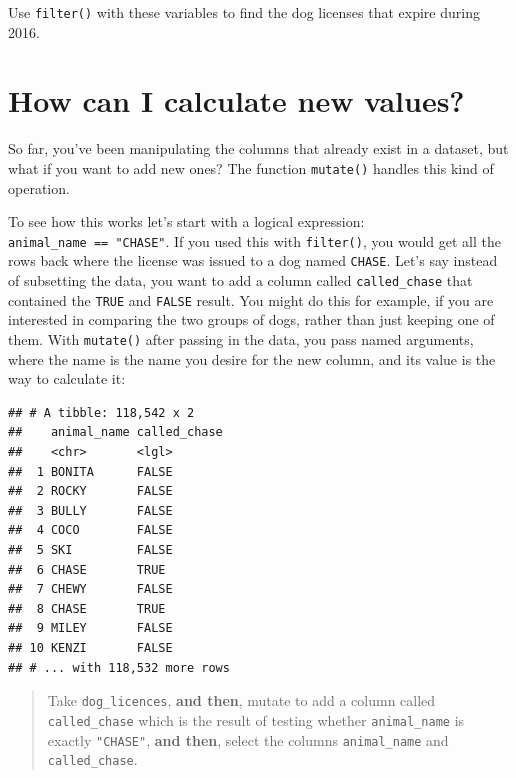 \documentclass[]{Nemilov}
\newenvironment{Shaded}{\begin{snugshade}}{\end{snugshade}}
\newcommand{\DataTypeTok}[1]{\textcolor[rgb]{0.13,0.29,0.53}{#1}}
\newcommand{\KeywordTok}[1]{\textcolor[rgb]{0.13,0.29,0.53}{\textbf{#1}}}
\newcommand{\NormalTok}[1]{#1}
\newcommand{\OperatorTok}[1]{\textcolor[rgb]{0.81,0.36,0.00}{\textbf{#1}}}
\newcommand{\StringTok}[1]{\textcolor[rgb]{0.31,0.60,0.02}{#1}}
\begin{document}
Use \texttt{filter()} with these variables to find the dog licenses that expire during 2016.

\hypertarget{how-can-i-calculate-new-values}{%
\section{How can I calculate new values?}\label{how-can-i-calculate-new-values}}

So far, you've been manipulating the columns that already exist in a dataset, but what if you want to add new ones? The function \texttt{mutate()} handles this kind of operation.

To see how this works let's start with a logical expression: \texttt{animal\_name\ ==\ "CHASE"}. If you used this with \texttt{filter()}, you would get all the rows back where the license was issued to a dog named \texttt{CHASE}. Let's say instead of subsetting the data, you want to add a column called \texttt{called\_chase} that contained the \texttt{TRUE} and \texttt{FALSE} result. You might do this for example, if you are interested in comparing the two groups of dogs, rather than just keeping one of them. With \texttt{mutate()} after passing in the data, you pass named arguments, where the name is the name you desire for the new column, and its value is the way to calculate it:

\begin{Shaded}
\end{Shaded}

\begin{verbatim}
## # A tibble: 118,542 x 2
##    animal_name called_chase
##    <chr>       <lgl>       
##  1 BONITA      FALSE       
##  2 ROCKY       FALSE       
##  3 BULLY       FALSE       
##  4 COCO        FALSE       
##  5 SKI         FALSE       
##  6 CHASE       TRUE        
##  7 CHEWY       FALSE       
##  8 CHASE       TRUE        
##  9 MILEY       FALSE       
## 10 KENZI       FALSE       
## # ... with 118,532 more rows
\end{verbatim}

\begin{quote}
Take \texttt{dog\_licences}, \textbf{and then},
mutate to add a column called \texttt{called\_chase} which is the result of testing whether \texttt{animal\_name} is exactly \texttt{"CHASE"}, \textbf{and then},
select the columns \texttt{animal\_name} and \texttt{called\_chase}.
\end{quote}
\end{document}
